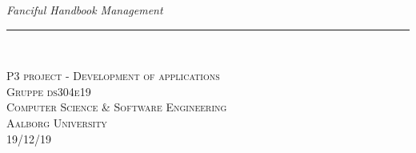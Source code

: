 


\thispagestyle{empty}
\begin{flushright}

\vspace{3cm}

\phantom{hul}

\phantom{hul}

\phantom{hul}

\textsl{\Huge  Fanciful Handbook Management} \\ \vspace{1cm}

\rule{13cm}{3mm} \\ \vspace{1.5cm}
\vspace{1cm}

\vspace{2cm} 
\textsc{\Large P3 project - Development of applications\\
Gruppe ds304e19 \\
Computer Science \& Software Engineering\\
Aalborg University\\
19/12/19\\}
\end{flushright}
